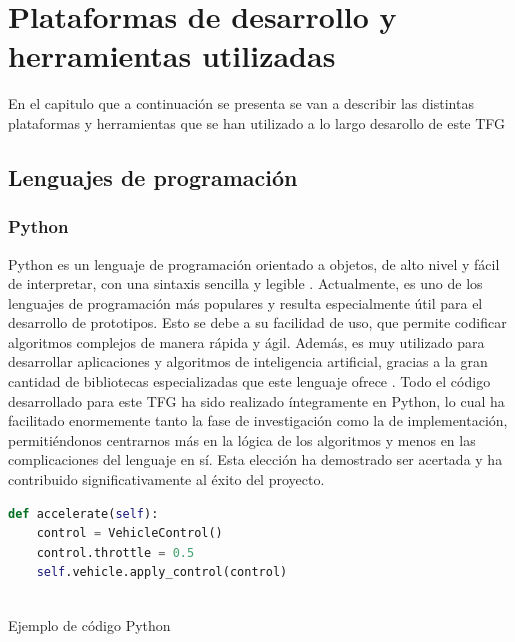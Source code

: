 \chapter{Plataformas de desarrollo y herramientas utilizadas}
\label{cap:capitulo3}

En el capitulo que a continuación se presenta se van a describir las distintas plataformas y herramientas que se han utilizado a lo largo desarollo de este \ac{TFG}

\section{Lenguajes de programación}
\label{sec:lenguajes_programacion}

\subsection{Python}
\label{subsec:python}

Python es un lenguaje de programación orientado a objetos, de alto nivel y fácil de interpretar, con una sintaxis sencilla y legible \cite{que_es_python_1}. Actualmente, es uno de los lenguajes de programación más populares y resulta especialmente útil para el desarrollo de prototipos. Esto se debe a su facilidad de uso, que permite codificar algoritmos complejos de manera rápida y ágil. Además, es muy utilizado para desarrollar aplicaciones y algoritmos de inteligencia artificial, gracias a la gran cantidad de bibliotecas especializadas que este lenguaje ofrece \cite{python_y_la_ia}. Todo el código desarrollado para este \ac{TFG} ha sido realizado íntegramente en Python, lo cual ha facilitado enormemente tanto la fase de investigación como la de implementación, permitiéndonos centrarnos más en la lógica de los algoritmos y menos en las complicaciones del lenguaje en sí. Esta elección ha demostrado ser acertada y ha contribuido significativamente al éxito del proyecto. 

\begin{code}[H]
\begin{lstlisting}[language=Python
]
 def accelerate(self):
    control = VehicleControl()  
    control.throttle = 0.5
    self.vehicle.apply_control(control)      
    
\end{lstlisting}
\caption[Ejemplo de código Python]{Ejemplo de código Python}
\label{cod:holamundo_python}
\end{code}

\newpage

